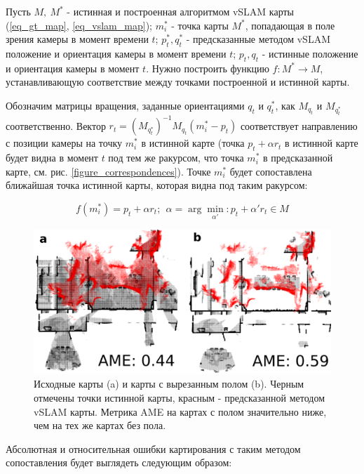 \documentclass{mipt-thesis-ms}
\begin{document}
	Пусть $M,\ M^*$ - истинная и построенная алгоритмом vSLAM карты (\ref{eq_gt_map}, \ref{eq_vslam_map}); $m_i^*$ - точка карты $M^*$, попадающая в поле зрения камеры в момент времени $t$; $p_t^*, q_t^*$ - предсказанные методом vSLAM положение и ориентация камеры в момент времени $t$; $p_t, q_t$ - истинные положение и ориентация камеры в момент $t$. Нужно построить функцию $f: M^* \longrightarrow M$, устанавливающую соответствие между точками построенной и истинной карты.
	
	Обозначим матрицы вращения, заданные ориентациями $q_t$ и $q_t^*$, как $M_{q_t}$ и $M_{q_t^*}$ соответственно. Вектор $r_t = (M_{q_t^*})^{-1} M_{q_t} (m_i^* - p_t)$ соответствует направлению с позиции камеры на точку $m_i^*$ в истинной карте (точка $p_t + \alpha r_t$ в истинной карте будет видна в момент $t$ под тем же ракурсом, что точка $m_i^*$ в предсказанной карте, см. рис. \ref{figure_correspondences}). Точке $m_i^*$ будет сопоставлена ближайшая точка истинной карты, которая видна под таким ракурсом:
	
	\begin{equation}
	\label{eq_corresp_function}
	f(m_i^*) = p_t + \alpha r_t;\ \ \alpha = \arg\min \limits_{\alpha'}: p_t + \alpha' r_t \in M
	\end{equation}
	
	\begin{figure}
		\includegraphics[width=1.0\textwidth]{img/1_first_paired.png}
		\caption{Исходные карты (a) и карты с вырезанным полом (b). Черным отмечены точки истинной карты, красным - предсказанной методом vSLAM карты. Метрика AME на картах с полом значительно ниже, чем на тех же картах без пола.}
		\label{figure_floor}
	\end{figure}

	Абсолютная и относительная ошибки картирования с таким методом сопоставления будет выглядеть следующим образом:
	
\end{document}
